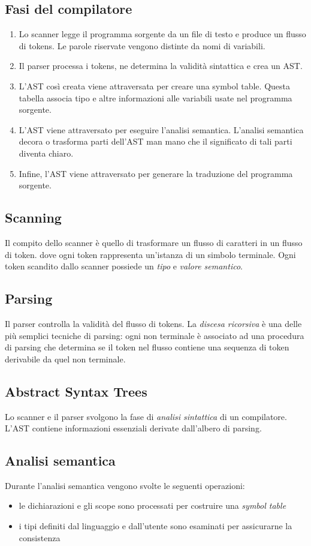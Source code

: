 \documentclass[11pt]{article}
\begin{document}
\subsection{Fasi del compilatore}
\begin{enumerate}
    \item Lo scanner legge il programma sorgente da un file di testo e produce un flusso di tokens. Le parole riservate 
    vengono distinte da nomi di variabili.
    \item Il parser processa i tokens, ne determina la validità sintattica e crea un AST. 
    \item L'AST così creata viene attraversata per creare una symbol table. Questa tabella associa tipo e altre informazioni 
    alle variabili usate nel programma sorgente.
    \item L'AST viene attraversato per eseguire l'analisi semantica. L'analisi semantica decora o trasforma parti dell'AST 
    man mano che il significato di tali parti diventa chiaro.
    \item Infine, l'AST viene attraversato per generare la traduzione del programma sorgente.
\end{enumerate}
\subsection{Scanning}
Il compito dello scanner è quello di trasformare un flusso di caratteri in un flusso di token. dove ogni token rappresenta 
un'istanza di un simbolo terminale. Ogni token scandito dallo scanner possiede un \textit{tipo} e \textit{valore semantico}.
\subsection{Parsing}
Il parser controlla la validità del flusso di tokens. La \textit{discesa ricorsiva} è una delle più semplici tecniche di 
parsing: ogni non terminale è associato ad una procedura di parsing che determina se il token nel flusso contiene una 
sequenza di token derivabile da quel non terminale.
\subsection{Abstract Syntax Trees}
Lo scanner e il parser svolgono la fase di \textit{analisi sintattica} di un compilatore. L'AST contiene informazioni 
essenziali derivate dall'albero di parsing.
\subsection{Analisi semantica}
Durante l'analisi semantica vengono svolte le seguenti operazioni:
\begin{itemize}
    \item le dichiarazioni e gli scope sono processati per costruire una \textit{symbol table}
    \item i tipi definiti dal linguaggio e dall'utente sono esaminati per assicurarne la consistenza
\end{itemize}
\end{document}
